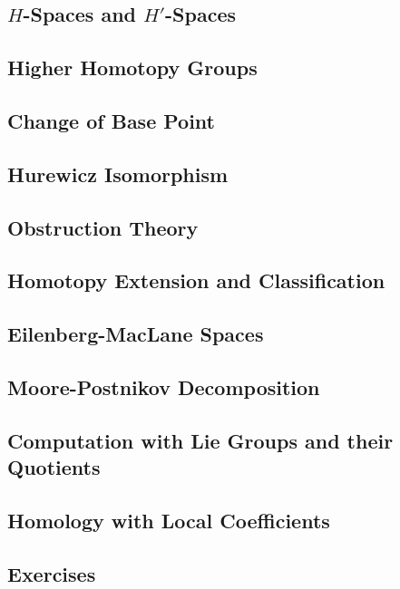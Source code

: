 \subsection{$H$-Spaces and $H'$-Spaces}

\subsection{Higher Homotopy Groups}

\subsection{Change of Base Point}

\subsection{Hurewicz Isomorphism}

\subsection{Obstruction Theory}

\subsection{Homotopy Extension and Classification}

\subsection{Eilenberg-MacLane Spaces}

\subsection{Moore-Postnikov Decomposition}

\subsection{Computation with Lie Groups and their Quotients}

\subsection{Homology with Local Coefficients}

\subsection{Exercises}

